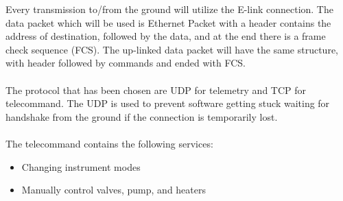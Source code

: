 \documentclass[a4paper,12pt,twoside]{article}
\begin{document}
\begin{enumerate}[label=(\alph*)]
Every transmission to/from the ground will utilize the E-link connection. The data packet which will be used is Ethernet Packet with a header contains the address of destination, followed by the data, and at the end there is a frame check sequence (FCS). The up-linked data packet will have the same structure, with header followed by commands and ended with FCS.\\
\\
The protocol that has been chosen are UDP for telemetry and TCP for telecommand. The UDP is used to prevent software getting stuck waiting for handshake from the ground if the connection is temporarily lost.\\
\\
The telecommand contains the following services:
\begin{itemize}
    \item Changing instrument modes
    \item Manually control valves, pump, and heaters
\end{itemize}


\end{enumerate}
\end{document}
